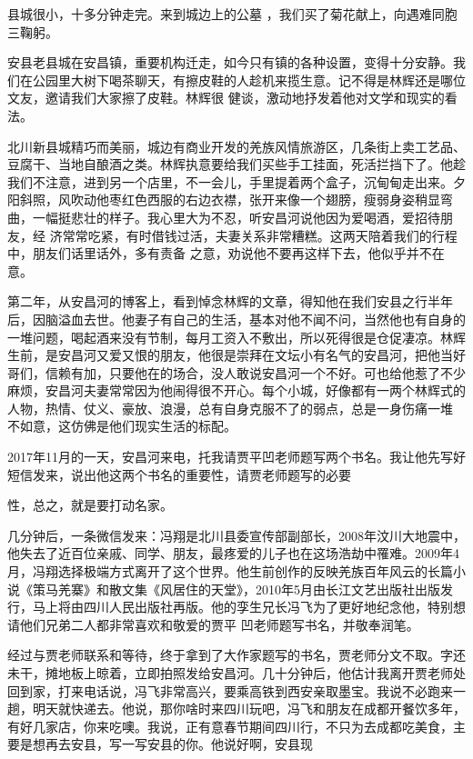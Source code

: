 \documentclass{article}
\begin{document}
县城很小，十多分钟走完。来到城边上的公墓
，我们买了菊花献上，向遇难同胞三鞠躬。 

安县老县城在安昌镇，重要机构迁走，如今只有镇的各种设置，变得十分安静。我们在公园里大树下喝茶聊天，有擦皮鞋的人趁机来揽生意。记不得是林辉还是哪位文友，邀请我们大家擦了皮鞋。林辉很
健谈，激动地抒发着他对文学和现实的看法。 

北川新县城精巧而美丽，城边有商业开发的羌族风情旅游区，几条街上卖工艺品、豆腐干、当地自酿酒之类。林辉执意要给我们买些手工挂面，死活拦挡下了。他趁我们不注意，进到另一个店里，不一会儿，手里提着两个盒子，沉甸甸走出来。夕阳斜照，风吹动他枣红色西服的右边衣襟，张开来像一个翅膀，瘦弱身姿稍显弯曲，一幅挺悲壮的样子。我心里大为不忍，听安昌河说他因为爱喝酒，爱招待朋友，经
\newpage
济常常吃紧，有时借钱过活，夫妻关系非常糟糕。这两天陪着我们的行程中，朋友们话里话外，多有责备
之意，劝说他不要再这样下去，他似乎并不在意。 

第二年，从安昌河的博客上，看到悼念林辉的文章，得知他在我们安县之行半年后，因脑溢血去世。他妻子有自己的生活，基本对他不闻不问，当然他也有自身的一堆问题，喝起酒来没有节制，每月工资入不敷出，所以死得很是仓促凄凉。林辉生前，是安昌河又爱又恨的朋友，他很是崇拜在文坛小有名气的安昌河，把他当好哥们，信赖有加，只要他在的场合，没人敢说安昌河一个不好。可也给他惹了不少麻烦，安昌河夫妻常常因为他闹得很不开心。每个小城，好像都有一两个林辉式的人物，热情、仗义、豪放、浪漫，总有自身克服不了的弱点，总是一身伤痛一堆
不如意，这仿佛是他们现实生活的标配。 

2017年11月的一天，安昌河来电，托我请贾平凹老师题写两个书名。我让他先写好短信发来，说出他这两个书名的重要性，请贾老师题写的必要

\newpage
性，总之，就是要打动名家。 

几分钟后，一条微信发来：冯翔是北川县委宣传部副部长，2008年汶川大地震中，他失去了近百位亲戚、同学、朋友，最疼爱的儿子也在这场浩劫中罹难。2009年4月，冯翔选择极端方式离开了这个世界。他生前创作的反映羌族百年风云的长篇小说《策马羌寨》和散文集《风居住的天堂》，2010年5月由长江文艺出版社出版发行，马上将由四川人民出版社再版。他的孪生兄长冯飞为了更好地纪念他，特别想请他们兄弟二人都非常喜欢和敬爱的贾平
凹老师题写书名，并敬奉润笔。 

经过与贾老师联系和等待，终于拿到了大作家题写的书名，贾老师分文不取。字还未干，摊地板上晾着，立即拍照发给安昌河。几十分钟后，他估计我离开贾老师处回到家，打来电话说，冯飞非常高兴，要乘高铁到西安亲取墨宝。我说不必跑来一趟，明天就快递去。他说，那你啥时来四川玩吧，冯飞和朋友在成都开餐饮多年，有好几家店，你来吃噢。我说，正有意春节期间四川行，不只为去成都吃美食，主要是想再去安县，写一写安县的你。他说好啊，安县现
\newpage
\end{document}
